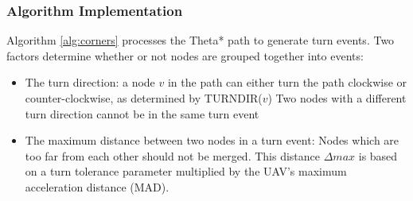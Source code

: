 
\subsubsection{Algorithm Implementation}
Algorithm \ref{alg:corners} processes the Theta* path to generate turn events. Two factors determine whether or not nodes are grouped together into events:
\begin{itemize}
\item The turn direction: a node $v$ in the path can either turn the path clockwise or counter-clockwise, as determined by TURNDIR($v$) Two nodes with a different turn direction cannot be in the same turn event
\item The maximum distance between two nodes in a turn event: Nodes which are too far from each other should not be merged. This distance $\Delta max$ is based on a turn tolerance parameter multiplied by the UAV's maximum acceleration distance (MAD). 
\end{itemize}



